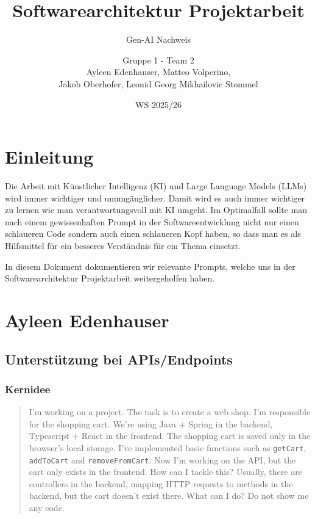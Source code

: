 \documentclass[12pt, a4paper]{scrreprt}
\title{Softwarearchitektur Projektarbeit}
\subtitle{Gen-AI Nachweis}
\author{Gruppe 1 - Team 2\\Ayleen Edenhauser, Matteo Volperino,\\Jakob Oberhofer, Leonid Georg Mikhailovic Stommel}
\date{WS 2025/26}
\begin{document}
	\maketitle

	\chapter*{Einleitung}

	Die Arbeit mit Künstlicher Intelligenz (KI) und Large Language Models (LLMs) wird immer wichtiger und unumgänglicher. Damit wird es auch immer wichtiger zu lernen wie man verantwortungsvoll mit KI umgeht. Im Optimalfall sollte man nach einem gewissenhaften Prompt in der Softwareentwicklung nicht nur einen schlaueren Code sondern auch einen schlaueren Kopf haben, so dass man es als Hilfsmittel für ein besseres Verständnis für ein Thema einsetzt.

	In diesem Dokument dokumentieren wir relevante Prompts, welche uns in der Softwarearchitektur Projektarbeit weitergeholfen haben.

	\tableofcontents

	\chapter{Ayleen Edenhauser}

	\section{Unterstützung bei APIs/Endpoints}

	\subsection{Kernidee}

	\begin{quote}
		I'm working on a project. The task is to create a web shop. I'm responsible for the shopping cart. We're using Java + Spring in the backend, Typescript + React in the frontend. The shopping cart is saved only in the browser's local storage. I've implemented basic functions such as \texttt{getCart}, \texttt{addToCart} and \texttt{removeFromCart}. Now I'm working on the API, but the cart only exists in the frontend. How can I tackle this? Usually, there are controllers in the backend, mapping HTTP requests to methods in the backend, but the cart doesn't exist there. What can I do? Do not show me any code.
	\end{quote}
\end{document}
